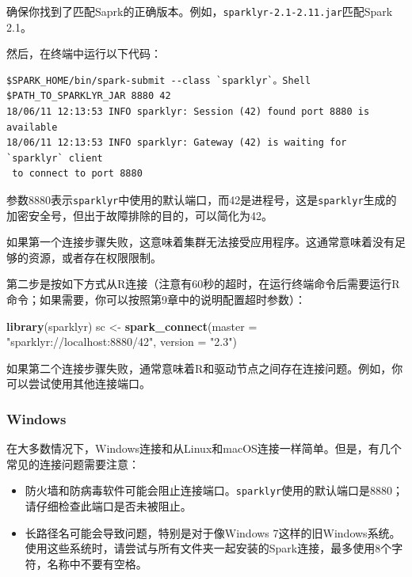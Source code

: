 \documentclass[
]{article}
\newenvironment{Shaded}{\begin{snugshade}}{\end{snugshade}}
\newcommand{\DataTypeTok}[1]{\textcolor[rgb]{0.13,0.29,0.53}{#1}}
\newcommand{\KeywordTok}[1]{\textcolor[rgb]{0.13,0.29,0.53}{\textbf{#1}}}
\newcommand{\NormalTok}[1]{#1}
\newcommand{\StringTok}[1]{\textcolor[rgb]{0.31,0.60,0.02}{#1}}
\providecommand{\tightlist}{%
  \setlength{\itemsep}{0pt}\setlength{\parskip}{0pt}}
\begin{document}
确保你找到了匹配Saprk的正确版本。例如，\texttt{sparklyr-2.1-2.11.jar}匹配Spark
2.1。

然后，在终端中运行以下代码：

\begin{verbatim}
$SPARK_HOME/bin/spark-submit --class `sparklyr`。Shell $PATH_TO_SPARKLYR_JAR 8880 42
18/06/11 12:13:53 INFO sparklyr: Session (42) found port 8880 is available
18/06/11 12:13:53 INFO sparklyr: Gateway (42) is waiting for `sparklyr` client
 to connect to port 8880
\end{verbatim}

参数8880表示\texttt{sparklyr}中使用的默认端口，而42是进程号，这是\texttt{sparklyr}生成的加密安全号，但出于故障排除的目的，可以简化为42。

如果第一个连接步骤失败，这意味着集群无法接受应用程序。这通常意味着没有足够的资源，或者存在权限限制。

第二步是按如下方式从R连接（注意有60秒的超时，在运行终端命令后需要运行R命令；如果需要，你可以按照第9章中的说明配置超时参数）：

\begin{Shaded}
\begin{Highlighting}[]
\KeywordTok{library}\NormalTok{(sparklyr)}
\NormalTok{sc <-}\StringTok{ }\KeywordTok{spark_connect}\NormalTok{(}\DataTypeTok{master =} \StringTok{"sparklyr://localhost:8880/42"}\NormalTok{, }\DataTypeTok{version =} \StringTok{"2.3"}\NormalTok{)}
\end{Highlighting}
\end{Shaded}

如果第二个连接步骤失败，通常意味着R和驱动节点之间存在连接问题。例如，你可以尝试使用其他连接端口。

\hypertarget{windows}{%
\subsubsection{Windows}\label{windows}}

在大多数情况下，Windows连接和从Linux和macOS连接一样简单。但是，有几个常见的连接问题需要注意：

\begin{itemize}
\tightlist
\item
  防火墙和防病毒软件可能会阻止连接端口。\texttt{sparklyr}使用的默认端口是8880；请仔细检查此端口是否未被阻止。
\item
  长路径名可能会导致问题，特别是对于像Windows
  7这样的旧Windows系统。使用这些系统时，请尝试与所有文件夹一起安装的Spark连接，最多使用8个字符，名称中不要有空格。
\end{itemize}
\end{document}
